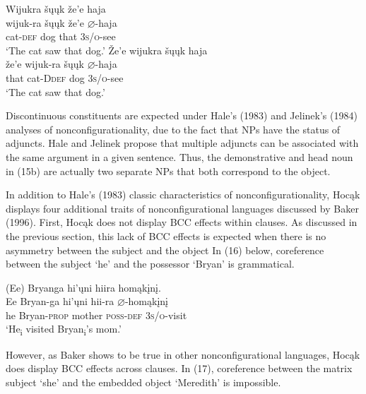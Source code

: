 \documentclass[output=paper]{LSP/langsci}
\begin{document}
\begin{exe}
\ex
\begin{xlist}
\ex  
\glll Wijukra	\v{s}\k{u}\k{u}k	\v{z}e'e	haja \\
wijuk-ra	\v{s}\k{u}\k{u}k	\v{z}e'e	$\varnothing$-haja \\
	cat-\textsc{def} 	dog	that		\textsc{3s/o}-see\\
\trans `The cat saw that dog.'
\ex 
\glll \v{Z}e'e	wijukra	 \v{s}\k{u}\k{u}k	haja \\
\v{z}e'e	wijuk-ra	\v{s}\k{u}\k{u}k	$\varnothing$-haja \\
that cat-D\textsc{def} dog \textsc{3s/o}-see \\
\trans `The cat saw that dog.'
\end{xlist}
\end{exe}

Discontinuous constituents are expected under Hale's (1983) and Jelinek's (1984) analyses of nonconfigurationality, due to the fact that NPs have the status of adjuncts. Hale and Jelinek propose that multiple adjuncts can be associated with the same argument in a given sentence. Thus, the demonstrative and head noun in (15b) are actually two separate NPs that both correspond to the object.

In addition to Hale's (1983) classic characteristics of nonconfigurationality, Hoc\k{a}k displays four additional traits of nonconfigurational languages discussed by Baker (1996). First, Hoc\k{a}k does not display BCC effects within clauses.  As discussed in the previous section, this lack of BCC effects is expected when there is no asymmetry between the subject and the object In (16) below, coreference between the subject `he' and the possessor `Bryan' is grammatical.

\begin{exe}
\ex	
\glll (Ee) 	Bryanga 			hi'\k{u}ni 	hiira 				hom\k{a}k\k{i}n\k{i}. \\
Ee 		Bryan-ga 		hi'\k{u}ni 	hii-ra 			$\varnothing$-hom\k{a}k\k{i}n\k{i} \\
he 		Bryan-\textsc{prop} mother 	\textsc{poss-def} 	\textsc{3s/o}-visit  \\
\trans `He\textsubscript{i} visited Bryan\textsubscript{i}'s mom.'
\end{exe}
However, as Baker shows to be true in other nonconfigurational languages, Hoc\k{a}k does display BCC effects across clauses. In (17), coreference between the matrix subject `she' and the embedded object `Meredith' is impossible.
\end{document}
